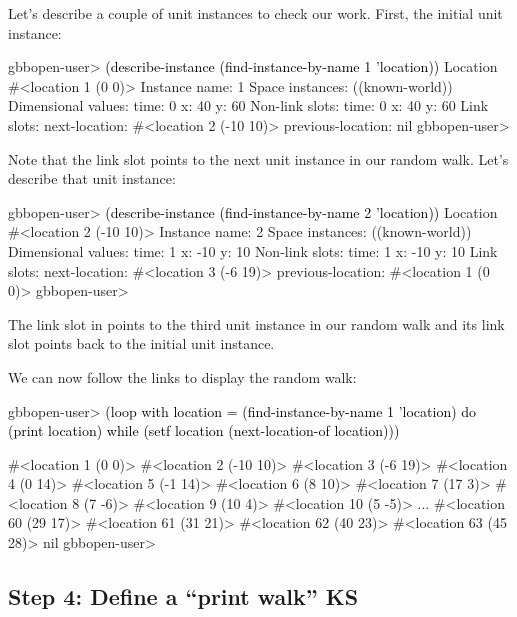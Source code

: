 \documentclass[10pt,twoside,english,pdftex]{article}
\begin{document}
Let's describe a couple of  unit instances to check our work.
First, the initial  unit instance:
%
\W\supp
\begin{example}
\textcolor{darkergray}{%
  gbbopen-user> \textcolor{black}{(describe-instance (find-instance-by-name 1 'location))}
  Location #<location 1 (0 0)>
    Instance name: 1
    Space instances: ((known-world))
    Dimensional values:
      time:  0
      x:  40
      y:  60
    Non-link slots:
      time:  0
      x:  40
      y:  60
    Link slots:
      next-location:  #<location 2 (-10 10)>
      previous-location:  nil
  gbbopen-user>}
\end{example}
%
Note that the  link slot points to the next
 unit instance in our random walk.  Let's describe that
unit instance:
%
\W\supp\notpretop
\begin{example}
\textcolor{darkergray}{%
  gbbopen-user> \textcolor{black}{(describe-instance (find-instance-by-name 2 'location))}
  Location #<location 2 (-10 10)>
    Instance name: 2
    Space instances: ((known-world))
    Dimensional values:
      time:  1
      x:  -10
      y:  10
    Non-link slots:
      time:  1
      x:  -10
      y:  10
    Link slots:
      next-location:  #<location 3 (-6 19)>
      previous-location:  #<location 1 (0 0)>
  gbbopen-user>}
\end{example}
%
The  link slot in   points to the
third  unit instance in our random walk and its
 link slot points back to the initial 
unit instance.

We can now follow the links to display the random walk:
%
\W\supp
\begin{example}
\textcolor{darkergray}{%
  gbbopen-user> \textcolor{black}{(loop with location = (find-instance-by-name 1 'location) 
                  do (print location)
                  while (setf location (next-location-of location)))}

  #<location 1 (0 0)> 
  #<location 2 (-10 10)> 
  #<location 3 (-6 19)> 
  #<location 4 (0 14)> 
  #<location 5 (-1 14)> 
  #<location 6 (8 10)> 
  #<location 7 (17 3)> 
  #<location 8 (7 -6)> 
  #<location 9 (10 4)> 
  #<location 10 (5 -5)> 
       ...
  #<location 60 (29 17)> 
  #<location 61 (31 21)> 
  #<location 62 (40 23)> 
  #<location 63 (45 28)> 
  nil
  gbbopen-user>}
\end{example}

\subsection*{Step 4: Define a ``print walk'' KS}
\end{document}
